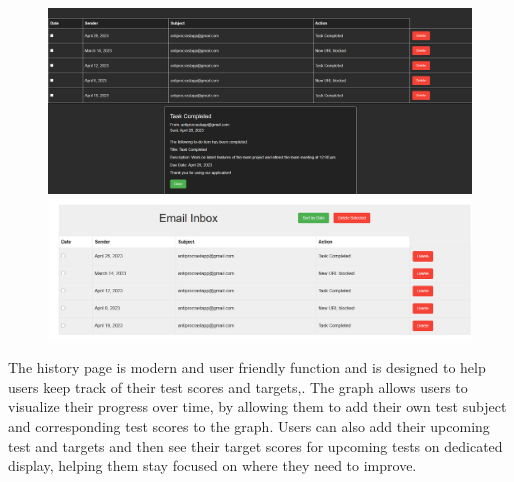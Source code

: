 \documentclass[a4paper]{article}
\begin{document}
\begin{figure}[H]
  \centering
  \begin{minipage}{0.49\textwidth}
    \centering
    \includegraphics[width=\linewidth]{./image/inbox_details_.png}
  \end{minipage}\hfill
  \begin{minipage}{0.49\textwidth}
    \centering
    \includegraphics[width=\linewidth]{./image/inbox_light_theme_.png}
  \end{minipage}
\end{figure}

The history page is modern and user friendly function and is designed to help users keep track of their test scores and targets,. The graph allows users to visualize their progress over time,  by allowing them to add their own test subject and corresponding test scores to the graph. Users can also add their upcoming test and targets and then see their target scores for upcoming tests on dedicated display, helping them stay focused on where they need to improve.
\end{document}
